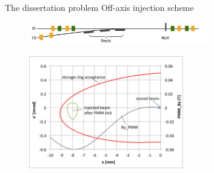 \documentclass[aspectratio=169]{beamer}
\begin{document}
\begin{frame}{The dissertation problem}
    Off-axis injection scheme
    \begin{figure}
        \centering
        \includegraphics[width=0.7\textwidth]{injection.pdf}
    \end{figure}
    \pause
    \begin{figure}
        \centering
        \includegraphics[width=0.6\textwidth]{nlk_phase_space.png}
    \end{figure}
\end{frame}
\end{document}

